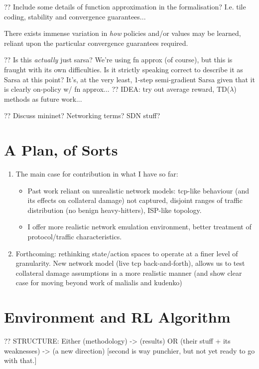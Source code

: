 \documentclass[conference, letterpaper, 10pt, times]{IEEEtran}
\begin{document}
?? Include some details of function approximation in the formalisation? I.e. tile coding, stability and convergence guarantees...

There exists immense variation in \emph{how} policies and/or values may be learned, reliant upon the particular convergence guarantees required.

?? Is this \emph{actually} just sarsa? We're using fn approx (of course), but this is fraught with its own difficulties. Is it strictly speaking correct to describe it as Sarsa at this point? It's, at the very least, 1-step semi-gradient Sarsa given that it is clearly on-policy w/ fn approx...
?? IDEA: try out average reward, TD($\lambda$) methods as future work...

?? Discuss mininet? Networking terms? SDN stuff?

\section{A Plan, of Sorts}

\begin{enumerate}
	\item The main case for contribution in what I have so far:
	\begin{itemize}
		\item Past work reliant on unrealistic network models: tcp-like behaviour (and its effects on collateral damage) not captured, disjoint ranges of traffic distribution (no benign heavy-hitters), ISP-like topology.
		\item I offer more realistic network emulation environment, better treatment of protocol/traffic characteristics.
	\end{itemize}
	\item Forthcoming: rethinking state/action spaces to operate at a finer level of granularity. New network model (live tcp back-and-forth), allows us to test collateral damage assumptions in a more realistic manner (and show clear case for moving beyond work of malialis and kudenko)
\end{enumerate}

\section{Environment and RL Algorithm}

?? STRUCTURE: Either (methodology) -> (results) OR (their stuff + its weaknesses) -> (a new direction) [second is way punchier, but not yet ready to go with that.]
\end{document}
